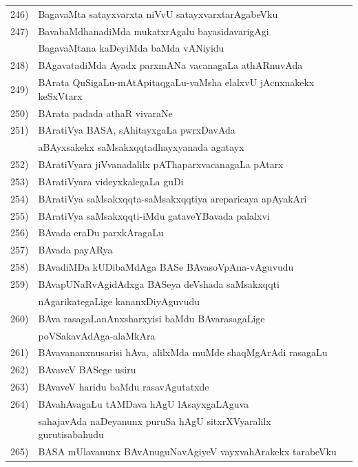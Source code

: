 {\begin{longtable}{@{}cp{7.4cm}r}
246) & BagavaMta satayxvarxta niVvU satayxvarxtarAgabeVku & \pageref{page79}\\ 
247) & BavabaMdhanadiMda mukatxrAgalu bayasidavarigAgi & \\
     & BagavaMtana kaDeyiMda baMda vANiyidu & \pageref{page251}   \\
248) & BAgavatadiMda Ayadx parxmANa vacanagaLa athARnuvAda & \pageref{page164}\\
249) & BArata QuSigaLu-mAtApitaqgaLu-vaMsha elalxvU jAcnxnakekx keSxVtarx & \pageref{page104}\\ 
250) & BArata padada athaR vivaraNe & \pageref{page20}\\
251) & BAratiVya BASA, sAhitayxgaLa pwrxDavAda & \\
     & aBAyxsakekx saMsakxqqtadhayxyanada agatayx & \pageref{page37}\\
252) & BAratiVyara jiVvanadalilx pAThaparxvacanagaLa pAtarx & \pageref{page105}\\
253) & BAratiVyara videyxkalegaLa guDi & \pageref{page22}\\
254) & BAratiVya saMsakxqqta-saMsakxqqtiya areparicaya apAyakAri & \pageref{page32}\\
255) & BAratiVya saMsakxqqti-iMdu gataveYBavada palalxvi & \pageref{page32}\\
256) & BAvada eraDu parxkAragaLu & \pageref{page230}\\
257) & BAvada payARya & \pageref{page230}\\
258) & BAvadiMDa kUDibaMdAga BASe BAvasoVpAna-vAguvudu & \pageref{page26}\\
259) & BAvapUNaRvAgidAdxga BASeya deVshada saMsakxqqti & \\
     & nAgarikategaLige kananxDiyAguvudu & \pageref{page16}\\
260) & BAva rasagaLanAnxsharxyisi baMdu BAvarasagaLige & \\
     & poVSakavAdAga-alaMkAra & \pageref{page245}\\
261) & BAvavananxnusarisi hAva, alilxMda muMde shaqMgArAdi rasagaLu &\pageref{page226}\\
262) & BAvaveV BASege usiru & \pageref{page9}\\
263) & BAvaveV haridu baMdu rasavAgutatxde & \pageref{page229}\\
264) & BAvahAvagaLu tAMDava hAgU lAsayxgaLAguva & \\
     & sahajavAda naDeyanunx puruSa hAgU sitxrXVyaralilx gurutisabahudu & \pageref{page226}\\
265) & BASA mUlavanunx BAvAnuguNavAgiyeV vayxvahArakekx tarabeVku & \pageref{page10}\\

\end{longtable}}
